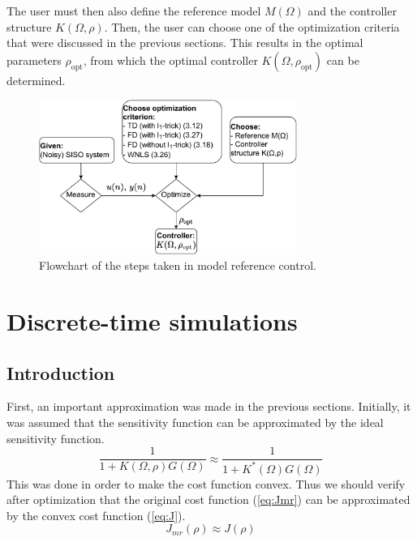 
The user must then also define the reference model $M(\Omega)$ and the controller structure $K(\Omega,\rho)$. Then, the user can choose one of the optimization criteria that were discussed in the previous sections. This results in the optimal parameters $\rho_{\mathrm{opt}}$, from which the optimal controller $K(\Omega,\rho_{\mathrm{opt}})$ can be determined.

\begin{figure}[H]
\centering
\includegraphics[width = 0.75\textwidth]{figures/flowchart.pdf}
\caption{Flowchart of the steps taken in model reference control.}
\label{fig:flowchart}
\end{figure}


\newpage
\section{Discrete-time simulations}
\label{sec:DT_simulations}

\subsection{Introduction}
\label{sec:DT_simulations_introduction}
First, an important approximation was made in the previous sections. Initially, it was assumed that the sensitivity function can be approximated by the ideal sensitivity function.
\begin{equation*}
\frac{1}{1 + K(\Omega,\rho) G(\Omega)} \approx \frac{1}{1 + K^{*}(\Omega) G(\Omega)}
\end{equation*}
This was done in order to make the cost function convex. Thus we should verify after optimization that the original cost function (\ref{eq:Jmr}) can be approximated by the convex cost function (\ref{eq:J}).
\begin{equation*}
	J_{mr}(\rho) \approx J(\rho)
\end{equation*}

